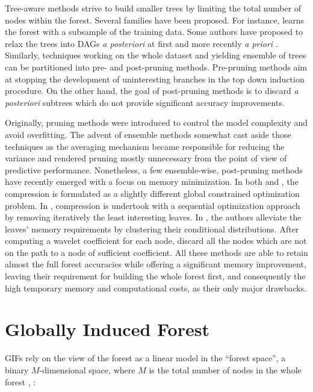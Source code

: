 \documentclass{article}
\begin{document}
Tree-aware methods strive to build smaller trees by limiting the total number
of nodes within the forest. Several families have been proposed. For instance,
\citet{breiman1999pasting} learns the forest with a subsample of the training
data. Some authors have proposed to relax the trees into DAGs {\it a
  posteriori} at first \citep[e.g.,][]{peterson2009dag} and more recently {\it
  a priori} \cite{shotton2013jungle}.  Similarly, techniques working on the
whole dataset and yielding ensemble of trees can be partitioned into pre- and
post-pruning methods. Pre-pruning methods aim at stopping the development of
uninteresting branches in the top down induction procedure. On the other hand,
the goal of post-pruning methods is to discard {\it a posteriori} subtrees which
do not provide significant accuracy improvements.

Originally, pruning methods were introduced to control the model complexity and
avoid overfitting. The advent of ensemble methods somewhat cast aside those
techniques as the averaging mechanism became responsible for reducing the
variance and rendered pruning mostly unnecessary from the point of view of
predictive performance. Nonetheless, a few ensemble-wise, post-pruning methods
have recently emerged with a focus on memory minimization. In both
\cite{meinshausen2009forestgarrote} and \cite{l1basedcomp}, the compression is
formulated as a slightly different global constrained optimization problem.  In
\cite{ren2015glorefinement}, compression is undertook with a sequential
optimization approach by removing iteratively the least interesting leaves.  In
\cite{vleeschouwer2015mitimemreq}, the authors alleviate the leaves' memory
requirements by clustering their conditional distributions. After computing a
wavelet coefficient for each node, \citet{elisha2016wavelet} discard all the
nodes which are not on the path to a node of sufficient coefficient.  All these
methods are able to retain almost the full forest accuracies while offering a
significant memory improvement, leaving their requirement for building the
whole forest first, and consequently the high temporary memory and
computational costs, as their only major drawbacks.





\section{Globally Induced Forest}
\label{sec:gif}

GIFs rely on the view of the forest as a linear model in the ``forest space'', 
a binary $M$-dimensional space, where $M$ is the total number of nodes in the 
whole forest \cite{l1basedcomp}, \cite{vens2011random}:
\end{document}
